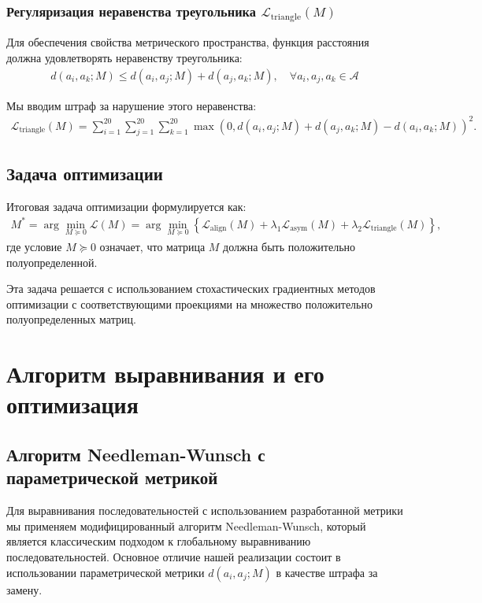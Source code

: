 \documentclass[12pt]{article}
\begin{document}
\subsubsection{Регуляризация неравенства треугольника $\mathcal{L}_{\text{triangle}}(M)$}

Для обеспечения свойства метрического пространства, функция расстояния должна удовлетворять неравенству треугольника:
\begin{align}
d(a_i, a_k; M) \leq d(a_i, a_j; M) + d(a_j, a_k; M), \quad \forall a_i, a_j, a_k \in \mathcal{A}
\end{align}

Мы вводим штраф за нарушение этого неравенства:
\begin{align}
\mathcal{L}_{\text{triangle}}(M) = \sum_{i=1}^{20} \sum_{j=1}^{20} \sum_{k=1}^{20} \max(0, d(a_i, a_j; M) + d(a_j, a_k; M) - d(a_i, a_k; M))^2.
\end{align}

\subsection{Задача оптимизации}

Итоговая задача оптимизации формулируется как:
\begin{align}
M^* = \arg\min_{M \succeq 0} \mathcal{L}(M) = \arg\min_{M \succeq 0} \left\{\mathcal{L}_{\text{align}}(M) + \lambda_1 \mathcal{L}_{\text{asym}}(M) + \lambda_2 \mathcal{L}_{\text{triangle}}(M)\right\},
\end{align}
где условие $M \succeq 0$ означает, что матрица $M$ должна быть положительно полуопределенной.

Эта задача решается с использованием стохастических градиентных методов оптимизации с соответствующими проекциями на множество положительно полуопределенных матриц.


\section{Алгоритм выравнивания и его оптимизация}

\subsection{Алгоритм Needleman-Wunsch с параметрической метрикой}

Для выравнивания последовательностей с использованием разработанной метрики мы применяем модифицированный алгоритм Needleman-Wunsch, который является классическим подходом к глобальному выравниванию последовательностей. Основное отличие нашей реализации состоит в использовании параметрической метрики $d(a_i, a_j; M)$ в качестве штрафа за замену.
\end{document}
